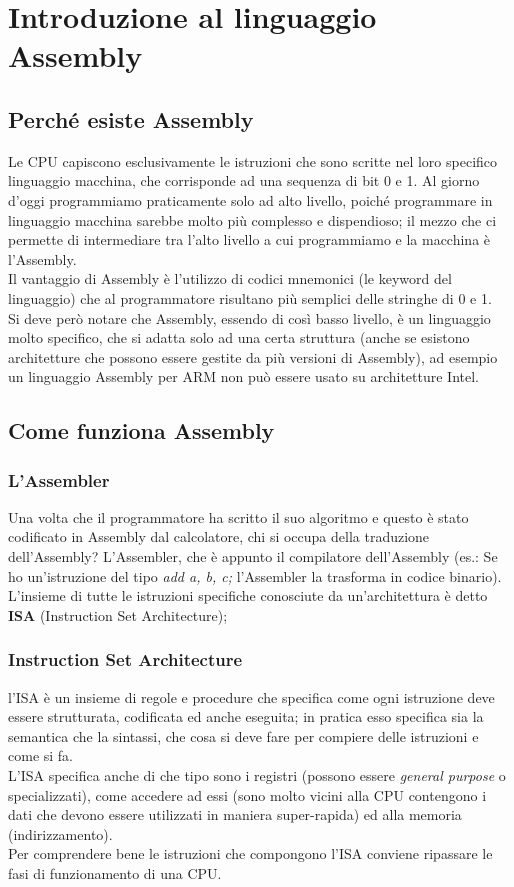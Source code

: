 \documentclass[class=book, crop=false]{standalone}
\begin{document}
\chapter{Introduzione al linguaggio Assembly}

\section{Perché esiste Assembly}

Le CPU capiscono esclusivamente le istruzioni che sono scritte nel loro specifico linguaggio macchina, che corrisponde ad una sequenza di bit 0 e 1.
Al giorno d’oggi programmiamo praticamente solo ad alto livello,  poiché programmare in linguaggio macchina sarebbe molto più complesso e dispendioso; il mezzo che ci permette di intermediare  tra l'alto livello a cui programmiamo e la macchina è l’Assembly.\\
Il vantaggio di Assembly è l’utilizzo di codici mnemonici  (le keyword del linguaggio) che al programmatore risultano più semplici delle stringhe di 0 e 1.\\
Si deve però notare che Assembly, essendo di così basso livello, è un linguaggio molto specifico, che si adatta solo ad una certa struttura (anche se esistono architetture che possono essere gestite da più versioni di Assembly), ad esempio un linguaggio Assembly per ARM non può essere usato su architetture Intel.

\section{Come funziona Assembly}

\subsection{L'Assembler}
Una volta che il programmatore ha scritto il suo algoritmo e questo è stato codificato in Assembly dal calcolatore, chi si occupa della traduzione dell’Assembly? L’Assembler, che è appunto il compilatore dell’Assembly (es.: Se ho un’istruzione del tipo \emph{add a, b, c;} l’Assembler la trasforma in codice binario).\\
L’insieme di tutte le istruzioni specifiche conosciute da un’architettura è detto \textbf{ISA} (Instruction Set Architecture);

\subsection{Instruction Set Architecture}
l’ISA è un insieme di regole e procedure che specifica come ogni istruzione deve essere strutturata, codificata ed anche eseguita; in pratica esso specifica sia la semantica che la sintassi, che cosa si deve fare per compiere delle istruzioni e come si fa.\\
L’ISA specifica anche di che tipo sono i registri (possono essere \emph{general purpose} o  specializzati), come accedere ad essi (sono molto vicini alla CPU contengono i dati che devono essere utilizzati in maniera super-rapida) ed alla memoria (indirizzamento).\\
Per comprendere bene le istruzioni che compongono l'ISA conviene ripassare le fasi di funzionamento di una CPU.
\end{document}
